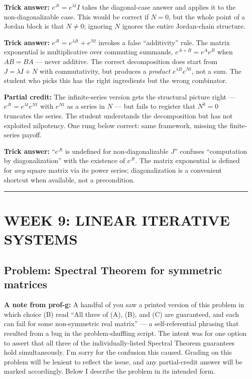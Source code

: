 \documentclass[12pt]{amsart}
\newcommand{\divider}{
  \vspace{-1em}
  \noindent
  \raisebox{-0.15ex}{\textbullet}%
  \hspace{0.5em}%
  \rule[0.5ex]{0.95\textwidth}{1.0pt}%
  \hspace{0.5em}%
  \raisebox{-0.15ex}{\textbullet}%
  \vspace{0em}
}
\begin{document}
\textbf{Trick answer:}
$e^{Jt} = e^{\lambda t} I$ takes the diagonal-case answer and applies it to
the non-diagonalizable case. This would be correct if $N = 0$, but the
whole point of a Jordan block is that $N \neq 0$; ignoring $N$ ignores the
entire Jordan-chain structure.

\textbf{Trick answer:}
$e^{Jt} = e^{\lambda I t} + e^{Nt}$ invokes a false ``additivity'' rule.
The matrix exponential is multiplicative over commuting summands,
$e^{A+B} = e^A e^B$ when $AB = BA$ --- never additive. The correct
decomposition does start from $J = \lambda I + N$ with commutativity, but
produces a \emph{product} $e^{\lambda I t} e^{Nt}$, not a sum. The student
who picks this has the right ingredients but the wrong combinator.

\textbf{Partial credit:}
The infinite-series version gets the structural picture right ---
$e^{Jt} = e^{\lambda t} e^{Nt}$ with $e^{Nt}$ as a series in $N$ --- but
fails to register that $N^k = 0$ truncates the series. The student
understands the decomposition but has not exploited nilpotency. One rung
below correct: same framework, missing the finite-series payoff.

\textbf{Trick answer:}
``$e^{Jt}$ is undefined for non-diagonalizable $J$'' confuses ``computation
by diagonalization'' with the existence of $e^{Jt}$. The matrix exponential
is defined for \emph{any} square matrix via its power series; diagonalization
is a convenient shortcut when available, not a precondition.

\divider

\section*{WEEK 9: LINEAR ITERATIVE SYSTEMS}

\subsection*{Problem: Spectral Theorem for symmetric matrices}

\textbf{A note from prof-g:} A handful of you saw a printed version of this
problem in which choice (B) read ``All three of (A), (B), and (C) are
guaranteed, and each can fail for some non-symmetric real matrix'' --- a
self-referential phrasing that resulted from a bug in the problem-shuffling
script. The intent was for one option to assert that all three of the
individually-listed Spectral Theorem guarantees hold simultaneously. I'm
sorry for the confusion this caused. Grading on this problem will be lenient
to reflect the issue, and any partial-credit answer will be marked accordingly.
Below I describe the problem in its intended form.
\end{document}
